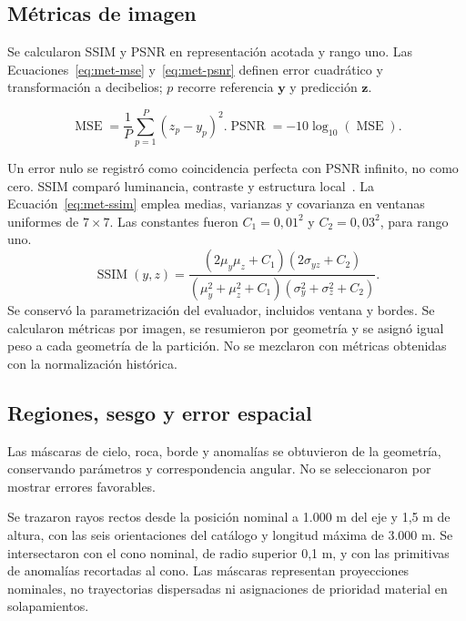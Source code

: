 \subsection{Métricas de imagen}
Se calcularon SSIM y PSNR en representación acotada y rango uno. Las Ecuaciones~\eqref{eq:met-mse} y~\eqref{eq:met-psnr} definen error cuadrático y transformación a decibelios; $p$ recorre referencia $\boldsymbol y$ y predicción $\boldsymbol z$.
\begin{samepage}
\begin{subequations}
\begin{equation}\operatorname{MSE}=\frac1P\sum_{p=1}^{P}(z_p-y_p)^2.\label{eq:met-mse}\end{equation}
\begin{equation}\operatorname{PSNR}=-10\log_{10}(\operatorname{MSE}).\label{eq:met-psnr}\end{equation}
\end{subequations}
\end{samepage}
Un error nulo se registró como coincidencia perfecta con PSNR infinito, no como cero. SSIM comparó luminancia, contraste y estructura local~\parencite{wang2004}. La Ecuación~\eqref{eq:met-ssim} emplea medias, varianzas y covarianza en ventanas uniformes de $7\times7$. Las constantes fueron $C_1=0{,}01^2$ y $C_2=0{,}03^2$, para rango uno.
\begin{equation}\operatorname{SSIM}(y,z)=\frac{(2\mu_y\mu_z+C_1)(2\sigma_{yz}+C_2)}{(\mu_y^2+\mu_z^2+C_1)(\sigma_y^2+\sigma_z^2+C_2)}.\label{eq:met-ssim}\end{equation}
Se conservó la parametrización del evaluador, incluidos ventana y bordes. Se calcularon métricas por imagen, se resumieron por geometría y se asignó igual peso a cada geometría de la partición. No se mezclaron con métricas obtenidas con la normalización histórica.

\subsection{Regiones, sesgo y error espacial}
Las máscaras de cielo, roca, borde y anomalías se obtuvieron de la geometría, conservando parámetros y correspondencia angular. No se seleccionaron por mostrar errores favorables.

Se trazaron rayos rectos desde la posición nominal a 1.000 m del eje y 1,5 m de altura, con las seis orientaciones del catálogo y longitud máxima de 3.000 m. Se intersectaron con el cono nominal, de radio superior 0,1 m, y con las primitivas de anomalías recortadas al cono. Las máscaras representan proyecciones nominales, no trayectorias dispersadas ni asignaciones de prioridad material en solapamientos.

